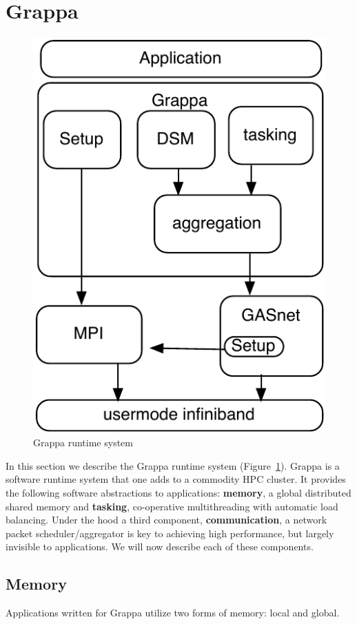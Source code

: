 \section{Grappa} \label{sec:grappa}

\begin{figure}[t]
\begin{center}
  \includegraphics[width=0.5\columnwidth]{figs/grappa-crappy}
\begin{minipage}{0.95\columnwidth}
  \caption{\label{fig:grappa} Grappa runtime system \vspace{-4ex}}
\end{minipage}
\vspace{-3ex}
\end{center}
\end{figure}

In this section we describe the Grappa runtime system (Figure~\ref{fig:grappa}).  Grappa is a software runtime system that one adds to a commodity HPC cluster.  It provides the following software abstractions to applications: \textbf{memory}, a global distributed shared memory and \textbf{tasking}, co-operative multithreading with automatic load balancing.  Under the hood a third component, \textbf{communication}, a network packet scheduler/aggregator is key to achieving high performance, but largely invisible to applications.  We will now describe each of these components.

\subsection{Memory}

Applications written for Grappa utilize two forms of memory: local and global.

